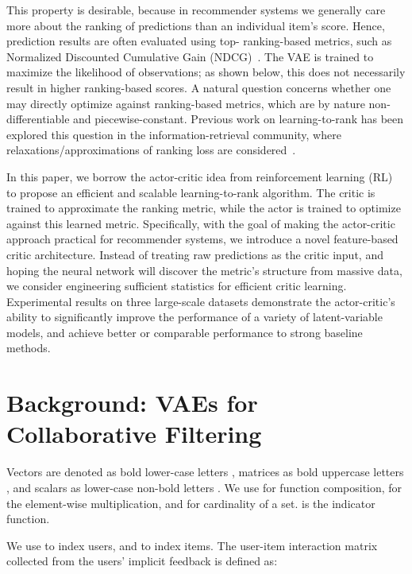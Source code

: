 \documentclass{article} \usepackage{iclr2020_conference,times}
\begin{document}
This property is desirable, because in recommender systems we generally care more about the ranking of predictions than an individual item's score.
Hence, prediction results are often evaluated using top- ranking-based metrics, such as Normalized Discounted Cumulative Gain (NDCG)~\citep{jarvelin2002cumulated}. The VAE is trained to maximize the likelihood of observations; as shown below, this does not necessarily result in higher ranking-based scores. 
A natural question concerns whether one may directly optimize against ranking-based metrics, which are by nature non-differentiable and piecewise-constant.
Previous work on learning-to-rank has been explored this question in the information-retrieval community, where relaxations/approximations of ranking loss are considered~\citep{weimer2008cofi,liu2009learning,li2014learning,weston2013learning}.



In this paper, we borrow the actor-critic idea from reinforcement learning (RL)~\citep{sutton1998reinforcement} to propose an efficient and scalable learning-to-rank algorithm. The critic is trained to approximate the ranking metric, while the actor is trained to optimize against this learned metric. 
Specifically, with the goal of making the actor-critic approach practical for recommender systems,
we introduce a novel feature-based critic architecture. Instead of treating raw predictions as the critic input, and hoping the neural network will discover the metric's structure from massive data, we consider engineering sufficient statistics for efficient critic learning.
Experimental results on three large-scale datasets demonstrate the actor-critic's ability to significantly improve the performance of a variety of latent-variable models, and achieve better or comparable performance to strong baseline methods.







\section{Background: VAEs for Collaborative Filtering}

Vectors are denoted as bold lower-case letters , matrices as bold uppercase letters , and scalars as lower-case non-bold letters . We use  for function composition,  for the element-wise multiplication, and  for cardinality of a set.  is the indicator function.

We use  to index users, and  to index items. The user-item interaction matrix  collected from the users' implicit feedback is defined as:
\end{document}
